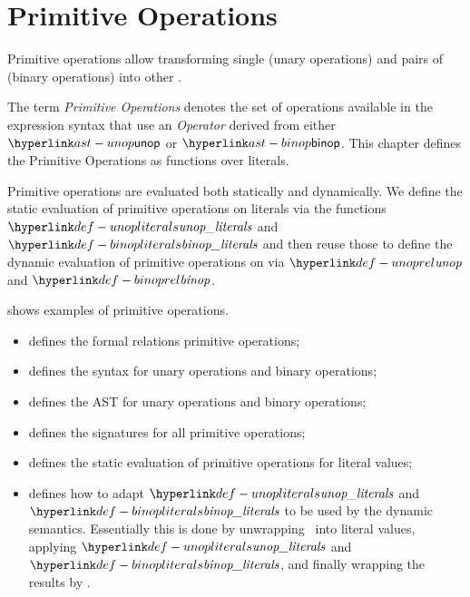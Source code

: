 \chapter{Primitive Operations\label{chap:PrimitiveOperations}}

Primitive operations allow transforming single \nativevalues{} (unary operations)
and pairs of \nativevalues{} (binary operations) into other \nativevalues{}.

The term \emph{Primitive Operations} denotes the set of operations available
in the expression syntax that use an \emph{Operator} derived from either
$\unop$ or $\binop$.
This chapter defines the Primitive Operations as functions over literals.

Primitive operations are evaluated both statically and dynamically.
We define the static evaluation of primitive operations on literals
via the functions $\unopliterals$ and $\binopliterals$ and then reuse
those to define the dynamic evaluation of primitive operations
on \nativevalues{} via $\unoprel$ and $\binoprel$.

 shows examples of primitive operations.

\ChapterOutline
\begin{itemize}
  \item {} defines the formal relations
        primitive operations;
  \item {} defines the syntax for unary operations and binary operations;
  \item {} defines the AST for unary operations and binary operations;
  \item {} defines the signatures for all primitive operations;
  \item {} defines the static evaluation of primitive operations for literal values;
  \item {} defines how to adapt $\unopliterals$
        and $\binopliterals$ to be used by the dynamic semantics. Essentially this is done by unwrapping
        \nativevalues\ into literal values, applying $\unopliterals$ and $\binopliterals$,
        and finally wrapping the results by \nativevalues.
\end{itemize}

